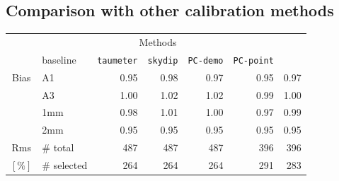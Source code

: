 



\subsection{Comparison with other calibration methods}
\label{se:photometry_others}

\begin{table}[!htbp]
\begin{center}
\begin{tabular}{clrrrrr}
  \hline\hline
  \noalign{\smallskip}
  \multicolumn{2}{c}{}  &  \multicolumn{5}{c}{Methods} \\\cline{3-7}
  \noalign{\smallskip}
  \multicolumn{2}{c}{Characteristics} &  baseline  & {\small {\tt taumeter}}  & {\small {\tt skydip}}  &  {\small {\tt PC-demo}} & {\small {\tt PC-point}} \\
  \hline
  \noalign{\smallskip}
  Bias &  A1            &   0.95   &  0.98    &  0.97    &   0.95    &  0.97  \\
       &  A3            &   1.00   &  1.02    &  1.02    &   0.99    &  1.00  \\
       &  1mm           &   0.98   &  1.01    &  1.00    &   0.97    &  0.99  \\
       &  2mm           &   0.95   &  0.95    &  0.95    &   0.95    &  0.95  \\
  \hline
  \noalign{\smallskip}
  Rms  &  $\#$ total    &   487    &    487   &    487    &    396    &  396 \\
  $[\%]$ &  $\#$ selected &   264    &    264   &    264    &    291    &  283 \\

\end{tabular}
\end{center}
\end{table}

